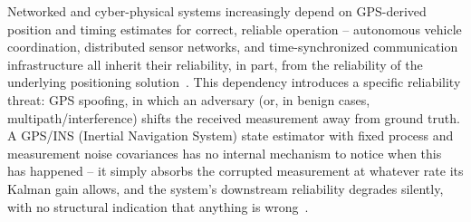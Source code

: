 \documentclass[conference]{IEEEtran}
\begin{document}
Networked and cyber-physical systems increasingly depend on GPS-derived position and timing estimates for correct, reliable operation -- autonomous vehicle coordination, distributed sensor networks, and time-synchronized communication infrastructure all inherit their reliability, in part, from the reliability of the underlying positioning solution~\cite{todo_gnss_reliability}. This dependency introduces a specific reliability threat: GPS spoofing, in which an adversary (or, in benign cases, multipath/interference) shifts the received measurement away from ground truth. A GPS/INS (Inertial Navigation System) state estimator with fixed process and measurement noise covariances has no internal mechanism to notice when this has happened -- it simply absorbs the corrupted measurement at whatever rate its Kalman gain allows, and the system's downstream reliability degrades silently, with no structural indication that anything is wrong~\cite{todo_ekf_spoofing}.
\end{document}
